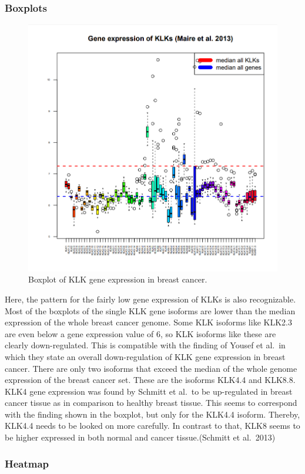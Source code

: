 \documentclass[
]{article}
\begin{document}
\hypertarget{boxplots}{%
\subsubsection{Boxplots}\label{boxplots}}

\begin{figure}

{\centering \includegraphics[width=0.5\linewidth]{images/Boxplot_breast} 

}

\caption{Boxplot of KLK gene expression in breast cancer.}\label{fig:Boxplot - breast }
\end{figure}

Here, the pattern for the fairly low gene expression of KLKs is also
recognizable. Most of the boxplots of the single KLK gene isoforms are
lower than the median expression of the whole breast cancer genome. Some
KLK isoforms like KLK2.3 are even below a gene expression value of 6, so
KLK isoforms like these are clearly down-regulated. This is compatible
with the finding of Yousef et al.~in which they state an overall
down-regulation of KLK gene expression in breast cancer. There are only
two isoforms that exceed the median of the whole genome expression of
the breast cancer set. These are the isoforms KLK4.4 and KLK8.8.\\
KLK4 gene expression was found by Schmitt et al.~to be up-regulated in
breast cancer tissue as in comparison to healthy breast tissue. This
seems to correspond with the finding shown in the boxplot, but only for
the KLK4.4 isoform. Thereby, KLK4.4 needs to be looked on more
carefully. In contrast to that, KLK8 seems to be higher expressed in
both normal and cancer tissue.(Schmitt et al.~2013)

\hypertarget{heatmap}{%
\subsubsection{Heatmap}\label{heatmap}}
\end{document}

